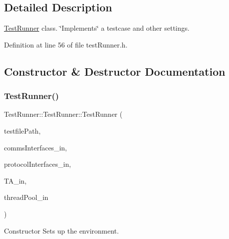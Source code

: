 \subsection{Detailed Description}
\mbox{\hyperlink{classTestRunner_1_1TestRunner}{Test\+Runner}} class. \char`\"{}\+Implements\char`\"{} a testcase and other settings. 

Definition at line 56 of file test\+Runner.\+h.



\subsection{Constructor \& Destructor Documentation}
\mbox{\label{classTestRunner_1_1TestRunner_a00b558f4bdc3553e357e992afafaf69d}} 
\subsubsection{\texorpdfstring{TestRunner()}{TestRunner()}}
{\footnotesize\ttfamily Test\+Runner\+::\+Test\+Runner\+::\+Test\+Runner (\begin{DoxyParamCaption}\item[{std\+::string const \&}]{testfile\+Path,  }\item[{\mbox{\hyperlink{namespacePluginLoader_a8e505caea20d9f45155939545d29f6ba}{Plugin\+Loader\+::shared\+Map\+\_\+t}}$<$ \mbox{\hyperlink{classCommunication_1_1I__communication}{Communication\+::\+I\+\_\+communication}} $>$}]{comms\+Interfaces\+\_\+in,  }\item[{\mbox{\hyperlink{namespacePluginLoader_a8e505caea20d9f45155939545d29f6ba}{Plugin\+Loader\+::shared\+Map\+\_\+t}}$<$ \mbox{\hyperlink{classProtocol_1_1I__protocolInterface}{Protocol\+::\+I\+\_\+protocol\+Interface}} $>$}]{protocol\+Interfaces\+\_\+in,  }\item[{std\+::unique\+\_\+ptr$<$ \mbox{\hyperlink{classtestAnalyser2_1_1I__TestAnalyser2}{test\+Analyser2\+::\+I\+\_\+\+Test\+Analyser2}} $>$}]{T\+A\+\_\+in,  }\item[{\mbox{\hyperlink{classThreadHandler_1_1ThreadPool}{Thread\+Handler\+::\+Thread\+Pool}} \&}]{thread\+Pool\+\_\+in }\end{DoxyParamCaption})}



Constructor Sets up the environment. 


